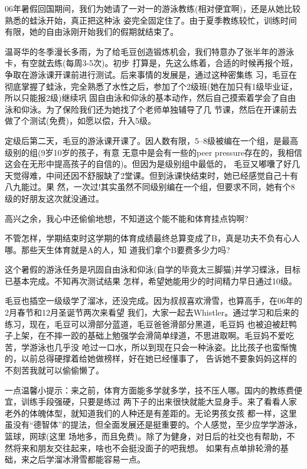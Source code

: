 \documentclass[11pt,a4paper,onecolumn]{article}
\begin{document}
06年暑假回国期间，我们为她请了一对一的游泳教练(相对便宜啊)，还是从她比较熟悉的蛙泳开始，真正把这种泳
姿完全固定住了。由于夏季教练较忙，训练时间有限，她的自由泳刚开始我们的假期就结束了。


温哥华的冬季漫长多雨，为了给毛豆创造锻炼机会，我们特意办了张半年的游泳卡，有空就去练(每周3-5次)。初步
打算是，先这么练着，合适的时候再报个班，争取在游泳课开课前进行测试。后来事情的发展是，通过这种密集练
习，毛豆在彻底掌握了蛙泳，完全熟悉了水性之后，参加了个2级班(她在加只有1级毕业证，所以只能报2级)继续巩
固自由泳和仰泳的基本动作，然后自己摸索着学会了自由泳和仰泳。为了保险我们还为她找了个老师单独辅导了几
节课，然后在开课前去做了个测试(免费)，如愿以偿，升入5级。


定级后第二天，毛豆的游泳课开课了。因人数有限，5--8级被编在一个组，是最高级别的组(9岁10岁的孩子，有意
无意中是会有一些的peer pressure存在的，我相信这会在无形中提高孩子的自信的)。但因为是级别组中最低的，
毛豆又嘟囔了好几天觉得难，中间还因不舒服缺了2堂课。但到泳课快结束时，她已经感觉自己十有八九能过。果
然，一次过!其实虽然不同级别编在一个组，但要求不同，她有个8级的好朋友这次就没通过。


高兴之余，我心中还偷偷地想，不知道这个能不能和体育挂点钩啊?


不管怎样，学期结束时这学期的体育成绩最终总算变成了B，真是功夫不负有心人哪。那些天生体育就是A的人，知
道我们拿个B要费多少力吗?


这个暑假的游泳任务是巩固自由泳和仰泳(自学的毕竟太三脚猫)并学习蝶泳，目标已基本完成。不知再次测试结果
怎样，希望她能用少的时间精力早日通过10级。


毛豆也插空一级级学了溜冰，还没完成。因为叔叔喜欢滑雪，也算高手，在06年的2月春节和12月圣诞节两次来看望
我们，大家一起去Whistler。通过学习和后来的练习，现在，毛豆可以滑部分蓝道，毛豆爸爸滑部分黑道，毛豆妈
也被迫被赶鸭子上架，在不摔一跤的基础上勉强学会滑简单绿道，不思进取啊。毛豆妈不爱吃苦，学游泳也几乎没
呛过一口水，所以到现在只会一种泳姿。比比孩子也蛮惭愧的，以前总得硬撑着给她做榜样，好在她已经懂事了，
告诉她不要象妈妈这样的不刻苦我就可以偷偷懒了。


一点温馨小提示：来之前，体育方面能多学就多学，技不压人哪。国内的教练费便宜，训练手段强硬，只要是练过
两下子的出来很快就能大显身手。来了看看人家老外的体魄体型，就知道我们的人种还是有差距的。无论男孩女孩
都一样，这里虽没有``德智体''的提法，但全面发展还是挺重要的。个人感觉，至少应学学游泳，篮球，网球(这里
场地多，而且免费)。除了为健身，对日后的社交也有帮助，不然将来和朋友交往起来，啥也不会挺没面子的吧我想。
如果有点单排轮滑的基础，来之后学溜冰滑雪都能容易一点。
\end{document}
